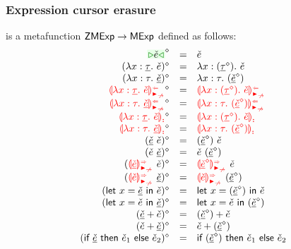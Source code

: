 \documentclass[formalism.tex]{subfiles}
\begin{document}
\subsubsection{Expression cursor erasure}
\label{sec:typed-expression-cursor-erasure}
\judgbox{\ensuremath{\cursorErase{\ZCMV}}} is a metafunction ${\normalfont\textsf{ZMExp}} \to {\normalfont\textsf{MExp}}$ defined as follows:
%
\newcommand{\cursorErasesToRow}[2]{\ensuremath{\cursorErase{#1} & = & #2}}
\[\begin{array}{rcl}
  \cursorErasesToRow{\ZCCursor{\ECMV}}{\ECMV} \\
  \cursorErasesToRow{(\ZCLamT{x}{\ZTMV}{\ECMV})}{\ECLam{x}{(\cursorErase{\ZTMV})}{\ECMV}} \\
  \cursorErasesToRow{(\ZCLamE{x}{\TMV}{\ZCMV})}{\ECLam{x}{\TMV}{(\cursorErase{\ZCMV})}} \\
  \cursorErasesToRow{\ZCLamAnaNonMatchedArrowT{x}{\ZTMV}{\ECMV}}{\ECLamAnaNonMatchedArrow{x}{(\cursorErase{\ZTMV})}{\ECMV}} \\
  \cursorErasesToRow{\ZCLamAnaNonMatchedArrowE{x}{\TMV}{\ZCMV}}{\ECLamAnaNonMatchedArrow{x}{\TMV}{(\cursorErase{\ZCMV})}} \\
  \cursorErasesToRow{\ZCLamInconAscT{x}{\ZTMV}{\ECMV}}{\ECLamInconAsc{x}{(\cursorErase{\ZTMV})}{\ECMV}} \\
  \cursorErasesToRow{\ZCLamInconAscE{x}{\TMV}{\ZCMV}}{\ECLamInconAsc{x}{\TMV}{(\cursorErase{\ZCMV})}} \\
  \cursorErasesToRow{(\ZCApL{\ZCMV}{\ECMV})}{\ECAp{(\cursorErase{\ZCMV})}{\ECMV}} \\
  \cursorErasesToRow{(\ZCApR{\ECMV}{\ZCMV})}{\ECAp{\ECMV}{(\cursorErase{\ZCMV})}} \\
  \cursorErasesToRow{(\ZCApSynNonMatchedArrowL{\ZCMV}{\ECMV})}{\ECApSynNonMatchedArrow{\cursorErase{\ZCMV}}{\ECMV}} \\
  \cursorErasesToRow{(\ZCApSynNonMatchedArrowR{\ECMV}{\ZCMV})}{\ECApSynNonMatchedArrow{\ECMV}{(\cursorErase{\ZCMV})}} \\
  \cursorErasesToRow{(\ZCLetL{x}{\ZCMV}{\ECMV})}{\ECLet{x}{(\cursorErase{\ZCMV})}{\ECMV}} \\
  \cursorErasesToRow{(\ZCLetR{x}{\ECMV}{\ZCMV})}{\ECLet{x}{\ECMV}{(\cursorErase{\ZCMV})}} \\
  \cursorErasesToRow{(\ZCPlusL{\ZCMV}{\ECMV})}{\ECPlus{(\cursorErase{\ZCMV})}{\ECMV}} \\
  \cursorErasesToRow{(\ZCPlusR{\ECMV}{\ZCMV})}{\ECPlus{\ECMV}{(\cursorErase{\ZCMV})}} \\
  \cursorErasesToRow{(\ZCIfC{\ZCMV}{\ECMV_1}{\ECMV_2})}{\ECIf{(\cursorErase{\ZCMV})}{\ECMV_1}{\ECMV_2}} \\

\end{array}\]
\end{document}
